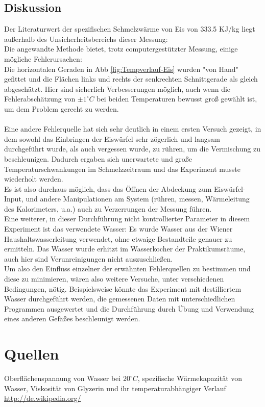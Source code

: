 \documentclass[12pt,a4paper]{article}
\begin{document}
\begin{multicols}{2}
\subsection{Diskussion}
Der Literaturwert der spezifischen Schmelzwärme von Eis von 333.5 KJ/kg liegt außerhalb des Unsicherheitsbereichs dieser Messung:\\
Die angewandte Methode bietet, trotz computergestützter Messung, einige mögliche Fehlerursachen:\\
Die horizontalen Geraden in Abb \ref{fig:Tempverlauf-Eis} wurden "von Hand" gefittet und die Flächen links und rechts der senkrechten Schnittgerade als gleich abgeschätzt. Hier sind sicherlich Verbesserungen möglich, auch wenn die Fehlerabschätzung von $\pm 1 ^\circ C$ bei beiden Temperaturen bewusst groß gewählt ist, um dem Problem gerecht zu werden.\\
\\
Eine andere Fehlerquelle hat sich sehr deutlich in einem ersten Versuch gezeigt, in dem sowohl das Einbringen der Eiswürfel sehr zögerlich und langsam durchgeführt wurde, als auch vergessen wurde, zu rühren, um die Vermischung zu beschleunigen. Dadurch ergaben sich unerwartete und große Temperaturschwankungen im Schmelzzeitraum und das Experiment musste wiederholt werden.\\
Es ist also durchaus möglich, dass das Öffnen der Abdeckung zum Eiswürfel-Input, und andere Manipulationen am System (rühren, messen, Wärmeleitung des Kalorimeters, u.a.) auch zu Verzerrungen der Messung führen.\\
Eine weiterer, in dieser Durchführung nicht kontrollierter Parameter in diesem Experiment ist das verwendete Wasser: Es wurde Wasser aus der Wiener Haushaltswasserleitung verwendet, ohne etwaige Bestandteile genauer zu ermitteln. Das Wasser wurde erhitzt im Wasserkocher der Praktikumsräume, auch hier sind Verunreinigungen nicht auszuschließen.\\
Um also den Einfluss einzelner der erwähnten Fehlerquellen zu bestimmen und diese zu minimieren, wären also weitere Versuche, unter verschiedenen Bedingungen, nötig. Beispielsweise könnte das Experiment mit destilliertem Wasser durchgeführt werden, die gemessenen Daten mit unterschiedlichen Programmen ausgewertet und die Durchführung durch Übung und Verwendung eines anderen Gefäßes beschleunigt werden.


\section{Quellen}
Oberflächenspannung von Wasser bei $20^{\circ}C$,
spezifische Wärmekapazität von Wasser,
Viskosität von Glyzerin und ihr temperaturabhängiger Verlauf
\url{http://de.wikipedia.org/}

\end{multicols}
\end{document}
